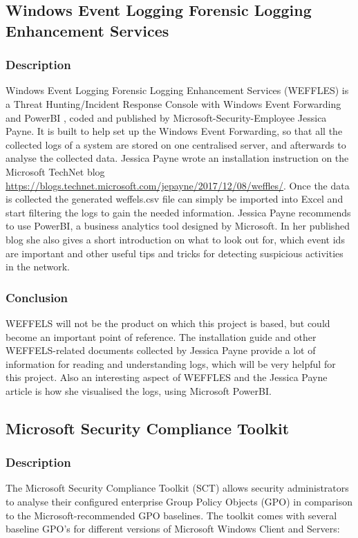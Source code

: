 \subsection{Windows Event Logging Forensic Logging Enhancement Services}\label{WEFFLES}
\subsubsection{Description}
Windows Event Logging Forensic Logging Enhancement Services (WEFFLES) \cite{WEFFLES} is a Threat Hunting/Incident Response Console with Windows Event Forwarding and PowerBI \cite{PowerBI}, coded and published by Microsoft-Security-Employee Jessica Payne. It is built to help set up the Windows Event Forwarding, so that all the collected logs of a system are stored on one centralised server, and afterwards to analyse the collected data. Jessica Payne wrote an installation instruction on the Microsoft TechNet blog \url{https://blogs.technet.microsoft.com/jepayne/2017/12/08/weffles/}. Once the data is collected  the generated weffels.csv file can simply be imported into Excel and start filtering the logs to gain the needed information. Jessica Payne recommends to use PowerBI, a business analytics tool designed by Microsoft. In her published blog she also gives a short introduction on what to look out for, which event ids are important and other useful tips and tricks for detecting suspicious activities in the network.
\subsubsection{Conclusion}
WEFFELS will not be the product on which this project is based, but could become an important point of reference. The installation guide and other WEFFELS-related documents collected by Jessica Payne provide a lot of information for reading and understanding logs, which will be very helpful for this project. Also an interesting aspect of WEFFLES and the Jessica Payne article is how she visualised the logs, using Microsoft PowerBI.


\subsection{Microsoft Security Compliance Toolkit}
\subsubsection{Description}
The Microsoft Security Compliance Toolkit (SCT) \cite{SCT} allows security administrators to analyse their configured enterprise Group Policy Objects (GPO) in comparison to the Microsoft-recommended GPO baselines. The toolkit comes with  several baseline GPO's for different versions of Microsoft Windows Client and Servers:

